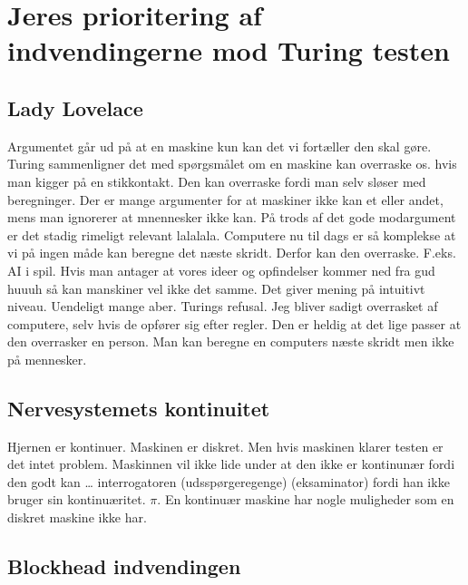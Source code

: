 \documentclass{article}
\begin{document}

\section{Jeres prioritering af indvendingerne mod Turing testen}
\subsection{Lady Lovelace}
Argumentet går ud på at en maskine kun kan det vi fortæller den skal gøre. Turing sammenligner det med spørgsmålet om en maskine kan overraske os. hvis man kigger på en stikkontakt. Den kan overraske fordi man selv sløser med beregninger.
Der er mange argumenter for at maskiner ikke kan et eller andet, mens man ignorerer at mnennesker ikke kan.
På trods af det gode modargument er det stadig rimeligt relevant lalalala.
Computere nu til dags er så komplekse at vi på ingen måde kan beregne det næste skridt. Derfor kan den overraske. F.eks. AI i spil.
Hvis man antager at vores ideer og opfindelser kommer ned fra gud huuuh så kan manskiner vel ikke det samme.
Det giver mening på intuitivt niveau.
Uendeligt mange aber.
Turings refusal. Jeg bliver sadigt overrasket af computere, selv hvis de opfører sig efter regler. Den er heldig at det lige passer at den overrasker en person.
Man kan beregne en computers næste skridt men ikke på mennesker.

\subsection{Nervesystemets kontinuitet}
Hjernen er kontinuer. Maskinen er diskret. Men hvis maskinen klarer testen er det intet problem.
Maskinnen vil ikke lide under at den ikke er kontinunær fordi den godt kan … interrogatoren (udsspørgeregenge) (eksaminator) fordi han ikke bruger sin  kontinuæritet. $\pi$. En kontinuær maskine har nogle muligheder som en diskret maskine ikke har.

\subsection{Blockhead indvendingen}
\end{document}
